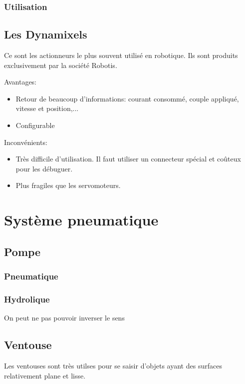 \documentclass[a4paper, 11pt]{report}
\begin{document}
\subsection{Utilisation}

\section{Les Dynamixels}
Ce sont les actionneurs le plus souvent utilisé en robotique. Ils sont produits exclusivement par la société Robotis.

Avantages:
\begin{itemize}
\item Retour de beaucoup d'informations: courant consommé, couple appliqué, vitesse et position,...
\item Configurable
\end{itemize}

Inconvénients:
\begin{itemize}
\item Très difficile d'utilisation. Il faut utiliser un connecteur spécial et coûteux pour les débuguer.
\item Plus fragiles que les servomoteurs.
\end{itemize} 

\chapter{Système pneumatique}

\section{Pompe}

\subsection{Pneumatique}

\subsection{Hydrolique}

On peut ne pas pouvoir inverser le sens

\section{Ventouse}
Les ventouses sont très utilses pour se saisir d'objets ayant des surfaces relativement plane et lisse.
\end{document}
